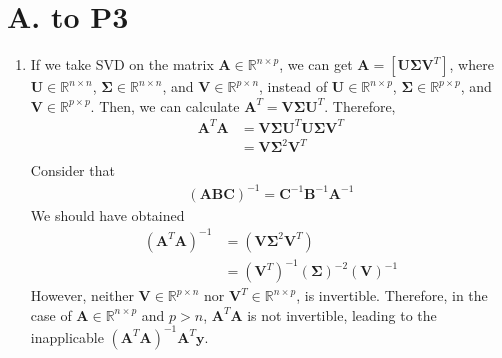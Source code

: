 \documentclass[11pt]{article}
\newcommand{\R}{\mathbb{R}}
\newcommand{\mtx}[1]{\mathbf{#1}}
\newcommand{\vct}[1]{\mathbf{#1}}
\def \mA {\mtx{A}}
\def \mU {\mtx{U}}
\def \mV {\mtx{V}}
\def \mSigma {\mtx{\Sigma}}
\def \vy {\vct{y}}
\def \R {\mathbb{R}}
\begin{document}
	\section*{A. to P3}
	\begin{enumerate}
		\item
		If we take SVD on the matrix $\mA \in \R^{n\times p}$, we can get $\mA=\left[\mU\mSigma\mV^T\right]$, where $\mU \in \R^{n\times n}$, $\mSigma \in \R^{n\times n}$, and $\mV\in\R^{p\times n}$, instead of $\mU \in \R^{n\times p}$, $\mSigma \in \R^{p\times p}$, and $\mV\in\R^{p\times p}$. Then, we can calculate $\mA^T=\mV\mSigma\mU^T$. Therefore,
		\begin{align*}
		\mA^T\mA&=\mV\mSigma\mU^T\mU\mSigma\mV^T\\
		&=\mV\mSigma^2\mV^T\\
		\end{align*}
		Consider that
		\begin{align*}
		\left(\mA\mtx{B}\mtx{C}\right)^{-1}=\mtx{C}^{-1}\mtx{B}^{-1}\mA^{-1}
		\end{align*}
		We should have obtained
		\begin{align*}
		\left(\mA^T\mA\right)^{-1}&=\left(\mV\mSigma^2\mV^T\right)\\
		&=\left(\mV^T\right)^{-1}\left(\mSigma\right)^{-2}\left(\mV\right)^{-1}
		\end{align*}
		However, neither $\mV \in \R^{p\times n}$ nor $\mV^T \in \R^{n \times p}$, is invertible. Therefore, in the case of $\mA \in\R^{n\times p}$ and $p>n$, $\mA^T\mA$ is not invertible, leading to the inapplicable $(\mA^T\mA)^{-1}\mA^T\vy$.
		

\end{enumerate}
\end{document}
